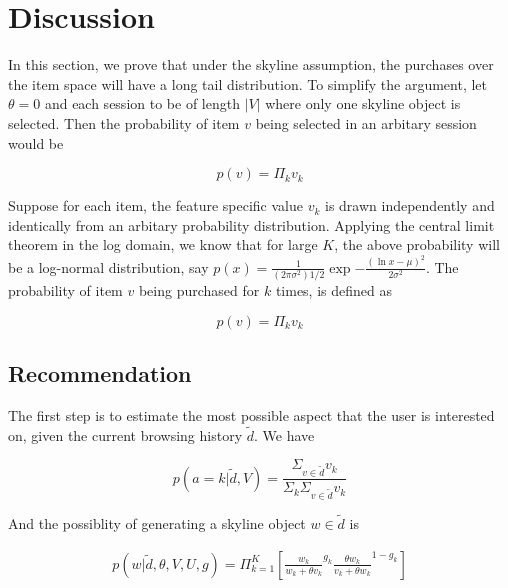 \documentclass[sigconf]{acmart}
\begin{document}
\section{Discussion}

In this section, we prove that under the skyline assumption, the purchases over the item space will have a long tail distribution. To simplify the argument, let $\theta=0$ and each session to be of length $|V|$ where only one skyline object is selected. Then the probability of item $v$ being selected in an arbitary session would be 

\begin{equation*}
p(v)=\Pi_k v_k
\end{equation*}

Suppose for each item, the feature specific value $v_k$ is drawn independently and identically from an arbitary probability distribution. Applying the central limit theorem in the log domain, we know that for large $K$, the above probability will be a log-normal distribution, say $p(x)=\frac{1}{{(2\pi\sigma^2)}{1/2}}\exp{-\frac{{(\ln x - \mu)}^2}{2\sigma^2}}$. The probability of item $v$ being purchased for $k$ times, is defined as 

\begin{equation*}
p(v)=\Pi_k v_k
\end{equation*}

\subsection{Recommendation}
The first step is to estimate the most possible aspect that the user is interested on, given the current browsing history $\tilde{d}$. We have

\begin{equation}\label{aprobability}
p(a=k|\tilde{d},V)=\frac{\Sigma_{v\in \tilde{d}} v_k}{\Sigma_k \Sigma_{v\in \tilde{d}} v_k}
\end{equation}

And the possiblity of generating a skyline object $w\in \tilde{d}$ is 

\begin{align}\label{equ:skylineprobability}
		p(w|\tilde{d},\theta,V,U,g) %
		= \Pi_{k=1}^{K}[ {\frac{w_k}{w_k+\theta v_k}}^{g_k} { \frac{\theta w_{k}}{v_{k}+\theta w_{k}}}^{1-g_k}]
\end{align}
\end{document}
